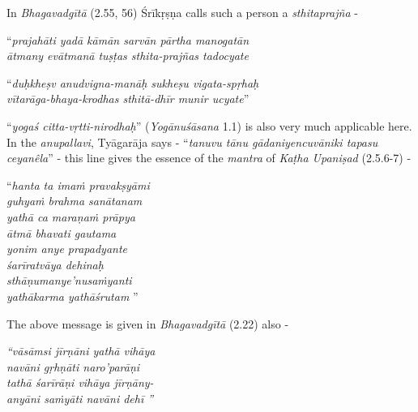 In \textit{Bhagavadgītā} (2.55, 56) Śrīkṛṣṇa calls such a person a \textit{sthitaprajña} -

\begin{longquote}
“\textit{prajahāti yadā kāmān sarvān pārtha manogatān }\\ \textit{ātmany evātmanā tuṣṭas sthita-prajñas tadocyate} 
\end{longquote}

\begin{longquote}
“\textit{duḥkheṣv anudvigna-manāḥ sukheṣu vigata-spṛhaḥ }\\ \textit{vītarāga-bhaya-krodhas sthitā-dhīr munir ucyate}”  
\end{longquote}

“\textit{yogaś citta-vṛtti-nirodhaḥ}” (\textit{Yogānuśāsana} 1.1) is also very much applicable here. In the \textit{anupallavi}, Tyāgarāja says - “\textit{tanuvu tānu gādani\newpage yencuvāniki tapasu ceyanêla}” - this line gives the essence of the \textit{mantra} of \textit{Kaṭha Upaniṣad} (2.5.6-7) -

\begin{centerquote}
“\textit{hanta ta imaṁ pravakṣyāmi}\\ \textit{guhyaṁ brahma sanātanam }\\ \textit{yathā ca maraṇaṁ prāpya}\\ \textit{ātmā bhavati gautama }\\ \textit{yonim anye prapadyante}\\ \textit{śarīratvāya dehinaḥ }\\ \textit{sthāṇumanye’nusaṁyanti}\\ \textit{yathākarma yathāśrutam} ”
\end{centerquote}

The above message is given in \textit{Bhagavadgītā} (2.22) also -

\begin{centerquote}
\textit{“vāsāmsi jīrṇāni yathā vihāya}\\ \textit{navāni gṛhṇāti naro’parāṇi }\\ \textit{tathā śarīrāṇi vihāya jīrṇāny-}\\ \textit{anyāni saṁyāti navāni dehī ”}
\end{centerquote}

